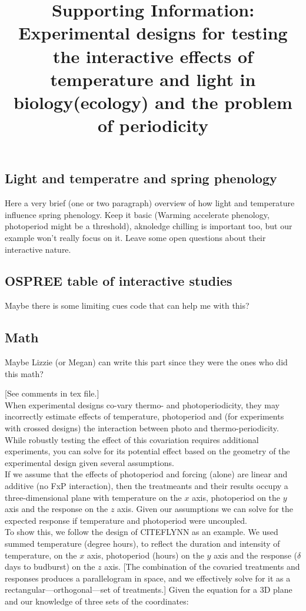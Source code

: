 \documentclass[11pt]{article}
\title{Supporting Information: Experimental designs for testing the interactive effects of temperature and light in biology(ecology) and the problem of periodicity }
\begin{document}
\maketitle
\subsection{Light and temperatre and spring phenology}
Here a very brief (one or two paragraph) overview of how light and temperature influence spring phenology. Keep it basic (Warming accelerate phenology, photoperiod might be a threshold), aknoledge chilling is important too, but our example won't really focus on it. Leave some open questions about their interactive nature.
\subsection{OSPREE table of interactive studies}
Maybe there is some limiting cues code that can help me with this?
\subsection{Math}
Maybe Lizzie (or Megan) can write this part since they were the ones who did this math?

[See comments in tex file.] \\
When experimental designs co-vary thermo- and photoperiodicity, they may incorrectly estimate effects of temperature, photoperiod and (for experiments with crossed designs) the interaction between photo and thermo-periodicity. While robustly testing the effect of this covariation requires additional experiments, you can solve for its potential effect based on the geometry of the experimental design given several assumptions.\\

If we assume that the effects of photoperiod and forcing (alone) are linear and additive (no FxP interaction), then the treatmeants and their results occupy a three-dimensional plane with temperature on the $x$ axis, photoperiod on the $y$ axis and the response on the $z$ axis. Given our assumptions we can solve for the expected response if temperature and photoperiod were uncoupled. \\

To show this, we follow the design of CITEFLYNN as an example. We used summed temperature (degree hours), to reflect the duration and intensity of temperature, on the $x$ axis, photoperiod (hours) on the $y$ axis and the response ($\delta$ days to budburst) on the $z$ axis. [The combination of the covaried treatments and responses produces a parallelogram in space, and we effectively solve for it as a rectangular---orthogonal---set of treatments.] Given the equation for a 3D plane and our knowledge of three sets of the coordinates:
\end{document}
